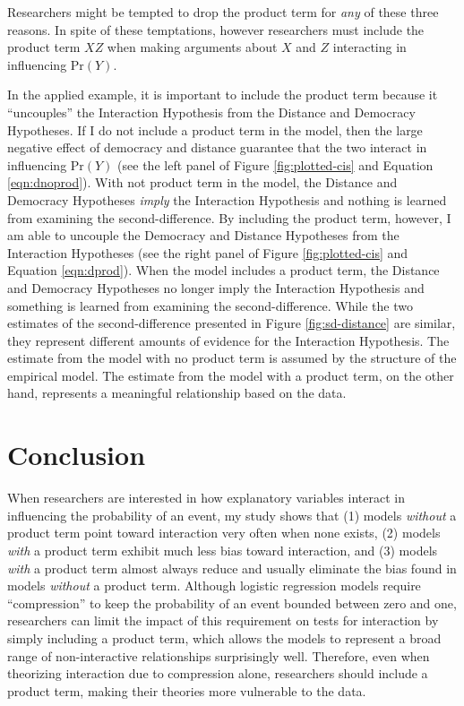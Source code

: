 \documentclass[12pt]{article}
\begin{document}
Researchers might be tempted to drop the product term for \textit{any} of these three reasons. In spite of these temptations, however researchers must include the product term $XZ$ when making arguments about $X$ and $Z$ interacting in influencing $\text{Pr}(Y)$. 

In the applied example, it is important to include the product term because it ``uncouples'' the Interaction Hypothesis from the Distance and Democracy Hypotheses. If I do not include a product term in the model, then the large negative effect of democracy and distance guarantee that the two interact in influencing $\text{Pr}(Y)$ (see the left panel of Figure \ref{fig:plotted-cis} and Equation \ref{eqn:dnoprod}). With not product term in the model, the Distance and Democracy Hypotheses \textit{imply} the Interaction Hypothesis and nothing is learned from examining the second-difference. By including the product term, however, I am able to uncouple the Democracy and Distance Hypotheses from the Interaction Hypotheses (see the right panel of Figure \ref{fig:plotted-cis} and Equation \ref{eqn:dprod}). When the model includes a product term, the Distance and Democracy Hypotheses no longer imply the Interaction Hypothesis and something is learned from examining the second-difference. While the two estimates of the second-difference presented in Figure \ref{fig:sd-distance} are similar, they represent different amounts of evidence for the Interaction Hypothesis. The estimate from the model with no product term is assumed by the structure of the empirical model. The estimate from the model with a product term, on the other hand, represents a meaningful relationship based on the data. 
\section*{Conclusion}

When researchers are interested in how explanatory variables interact in influencing the probability of an event, my study shows that (1) models \textit{without} a product term point toward interaction very often when none exists, (2) models \textit{with} a product term exhibit much less bias toward interaction, and (3) models \textit{with} a product term almost always reduce and usually eliminate the bias found in models \textit{without }a product term.  Although logistic regression models require ``compression''  to keep the probability of an event bounded between zero and one, researchers can limit the impact of this requirement on tests for interaction by simply including a product term, which allows the models to represent a  broad range of non-interactive relationships surprisingly well. Therefore, even when theorizing interaction due to compression alone, researchers should include a product term, making their theories more vulnerable to the data.\normalsize
\end{document}
